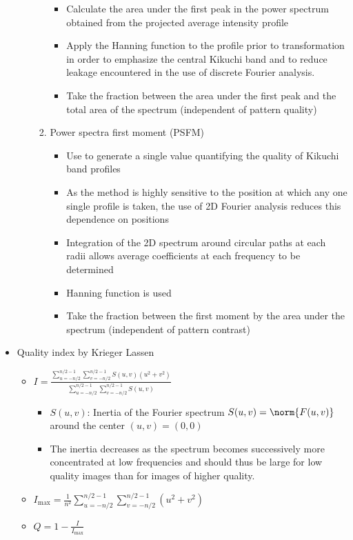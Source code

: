 \documentclass[letterpaper]{article}
\begin{document}
\begin{itemize}
\begin{itemize}
\begin{enumerate}
\begin{itemize}
										\item Calculate the area under the first peak in the power spectrum obtained from the projected average intensity profile
										\item Apply the Hanning function to the profile prior to transformation in order to emphasize the central Kikuchi band and to reduce leakage encountered in the use of discrete Fourier analysis.
										\item Take the fraction between the area under the first peak and the total area of the spectrum (independent of pattern quality)
									\end{itemize}
								\item Power spectra first moment (PSFM)
									\begin{itemize}
											\item Use to generate a single value quantifying the quality of Kikuchi band profiles
											\item As the method is highly sensitive to the position at which any one single profile is taken, the use of 2D Fourier analysis reduces this dependence on positions
											\item Integration of the 2D spectrum around circular paths at each radii allows average coefficients at each frequency to be determined
											\item Hanning function is used
											\item Take the fraction between the first moment by the area under the spectrum (independent of pattern contrast)
										\end{itemize}
							\end{enumerate}
					\end{itemize}
\newpage
				\item Quality index by Krieger Lassen \cite{KriegerLassen1994}
					\begin{itemize}
						\item $I = \frac{\sum\limits_{u=-n/2}^{n/2-1}{\sum\limits_{v=-n/2}^{n/2-1}{S(u,v)(u^2 + v^2)}}} {\sum\limits_{u=-n/2}^{n/2-1}{\sum\limits_{v=-n/2}^{n/2-1}{S(u,v)}}}$
							\begin{itemize}
								\item $S(u,v)$: Inertia of the Fourier spectrum $S(u,v) = \norm{F(u,v)}$ around the center $(u,v) = (0,0)$
								\item The inertia decreases as the spectrum becomes successively more concentrated at low frequencies and should thus be large for low quality images than for images of higher quality.
							\end{itemize}
						\item $I_{\text{max}} = \frac{1}{n^2}\sum\limits_{u=-n/2}^{n/2-1}{\sum\limits_{v=-n/2}^{n/2-1}{(u^2+v^2)}}$
						\item $Q = 1 - \frac{I}{I_{\text{max}}}$
					\end{itemize}
			\end{itemize}
		
\end{document}
